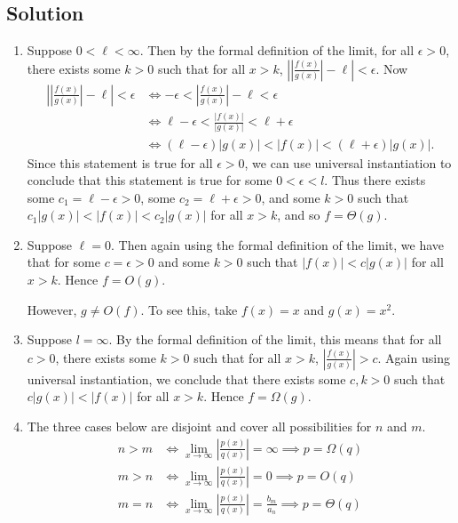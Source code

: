 \documentclass{article}
\begin{document}
\subsection*{Solution}
    \begin{enumerate}
        \item Suppose $0 < \ell < \infty$. Then by the formal definition of the limit, for all $\epsilon > 0$, there exists some $k > 0$ such that for all $x > k$, $\left|\left|\frac{f(x)}{g(x)}\right| - \ell\right| < \epsilon$. Now
        \begin{align*}
            \left|\left|\frac{f(x)}{g(x)}\right| - \ell\right| < \epsilon &\iff - \epsilon < \left|\frac{f(x)}{g(x)}\right| - \ell < \epsilon \\
            &\iff \ell - \epsilon < \frac{|f(x)|}{|g(x)|} < \ell + \epsilon \\
            &\iff (\ell - \epsilon)\left|g(x)\right| < \left|f(x)\right| < (\ell + \epsilon)\left|g(x)\right|.
        \end{align*}
        Since this statement is true for all $\epsilon > 0$, we can use universal instantiation to conclude that this statement is true for some $0 < \epsilon < l$. Thus there exists some $c_{1} = \ell - \epsilon > 0$, some $c_{2} = \ell + \epsilon > 0$, and some $k > 0$ such that $c_{1}|g(x)| < |f(x)| < c_{2}|g(x)|$ for all $x > k$, and so $f = \Theta(g)$.
        \item Suppose $\ell = 0$. Then again using the formal definition of the limit, we have that for some $c = \epsilon > 0$ and some $k > 0$ such that $|f(x)| < c|g(x)|$ for all $x > k$. Hence $f = O(g)$.
        
        \vspace{1.5mm}
        However, $g \ne O(f)$. To see this, take $f(x) = x$ and $g(x) = x^2$.
        \item Suppose $l = \infty$. By the formal definition of the limit, this means that for all $c > 0$, there exists some $k > 0$ such that for all $x > k$, $\left|\frac{f(x)}{g(x)}\right| > c$. Again using universal instantiation, we conclude that there exists some $c, k > 0$ such that $c|g(x)| < |f(x)|$ for all $x > k$. Hence $f = \Omega(g)$.
        \item The three cases below are disjoint and cover all possibilities for $n$ and $m$.
        \begin{align*}
            n > m &\iff \lim_{x \rightarrow \infty} \left|\frac{p(x)}{q(x)}\right| = \infty \implies p = \Omega(q) \\
            m > n &\iff \lim_{x \rightarrow \infty} \left|\frac{p(x)}{q(x)}\right| = 0 \implies p = O(q) \\
            m = n &\iff \lim_{x \rightarrow \infty} \left|\frac{p(x)}{q(x)}\right| = \frac{b_{m}}{a_{n}} \implies p = \Theta(q)
        \end{align*}
    \end{enumerate}
\end{document}
